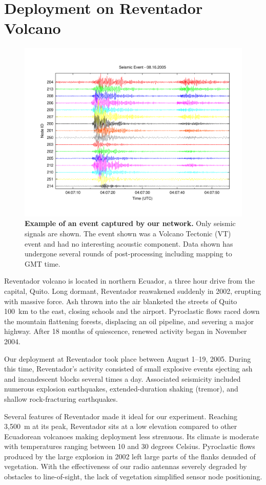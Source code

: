 \section{Deployment on Reventador Volcano}
\label{evaluation-sec-deployment}

\begin{figure}[t]
\begin{center}
\includegraphics[width=0.7\hsize]{./3-evaluation/figs/event.pdf}
\end{center}
\caption{\textbf{Example of an event captured by our network.} Only seismic
signals are shown. The event shown was a Volcano Tectonic (VT) event and had
no interesting acoustic component. Data shown has undergone several rounds of
post-processing including mapping to GMT time.}
\label{evaluation-fig-event}
\end{figure}

Reventador volcano is located in northern Ecuador, a three hour drive from
the capital, Quito. Long dormant, Reventador reawakened suddenly in 2002,
erupting with massive force. Ash thrown into the air blanketed the streets of
Quito 100~km to the east, closing schools and the airport. Pyroclastic flows
raced down the mountain flattening forests, displacing an oil pipeline, and
severing a major highway. After 18 months of quiescence, renewed activity
began in November 2004.

\vfill\eject

Our deployment at Reventador took place between August 1--19, 2005. During
this time, Reventador's activity consisted of small explosive events ejecting
ash and incandescent blocks several times a day. Associated seismicity
included numerous explosion earthquakes, extended-duration shaking (tremor),
and shallow rock-fracturing earthquakes.

Several features of Reventador made it ideal for our experiment. Reaching
3,500~m at its peak, Reventador sits at a low elevation compared to other
Ecuadorean volcanoes making deployment less strenuous. Its climate is
moderate with temperatures ranging between 10 and 30 degrees Celsius.
Pyroclastic flows produced by the large explosion in 2002 left large parts of
the flanks denuded of vegetation. With the effectiveness of our radio
antennas severely degraded by obstacles to line-of-sight, the lack of
vegetation simplified sensor node positioning.


